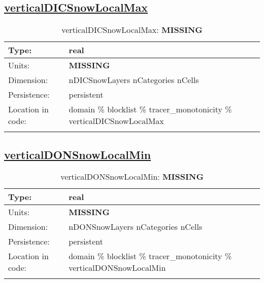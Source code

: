 \subsection[verticalDICSnowLocalMax]{\hyperref[sec:var_tab_tracer_monotonicity]{verticalDICSnowLocalMax}}
\label{subsec:var_sec_tracer_monotonicity_verticalDICSnowLocalMax}
\begin{center}
\begin{longtable}{| p{2.0in} | p{4.0in} |}
        \hline 
        Type: & real \\
        \hline 
        Units: & {\bf \color{red} MISSING} \\
        \hline 
        Dimension: & nDICSnowLayers nCategories nCells \\
        \hline 
        Persistence: & persistent \\
        \hline 
         Location in code: & domain \% blocklist \% tracer\_monotonicity \% verticalDICSnowLocalMax \\
         \hline 
    \caption{verticalDICSnowLocalMax: {\bf \color{red} MISSING}}
\end{longtable}
\end{center}
\subsection[verticalDONSnowLocalMin]{\hyperref[sec:var_tab_tracer_monotonicity]{verticalDONSnowLocalMin}}
\label{subsec:var_sec_tracer_monotonicity_verticalDONSnowLocalMin}
\begin{center}
\begin{longtable}{| p{2.0in} | p{4.0in} |}
        \hline 
        Type: & real \\
        \hline 
        Units: & {\bf \color{red} MISSING} \\
        \hline 
        Dimension: & nDONSnowLayers nCategories nCells \\
        \hline 
        Persistence: & persistent \\
        \hline 
         Location in code: & domain \% blocklist \% tracer\_monotonicity \% verticalDONSnowLocalMin \\
         \hline 
    \caption{verticalDONSnowLocalMin: {\bf \color{red} MISSING}}
\end{longtable}
\end{center}
